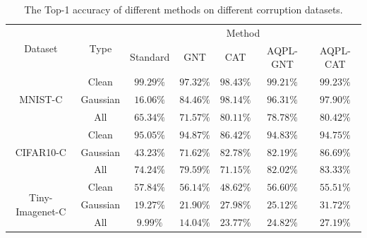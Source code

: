 \documentclass[letterpaper]{article} %
\begin{document}
\begin{table}[!t]
	\centering
	\begin{tabular}{c|c|ccccc}
		\hline
		\multirow{2}{*}{Dataset} & \multirow{2}{*}{Type}
		&\multicolumn{5}{c}{Method}\\
		\cline{3-7}
		&&Standard & GNT & CAT & AQPL-GNT & AQPL-CAT\\
		\hline
		\multirow{3}{*}{MNIST-C}
		& Clean & $\bm{99.29\%}$ & $97.32\%$ & $98.43\%$ & $99.21\%$ & $99.23\%$ \\
		& Gaussian & $16.06\%$ & $84.46\%$ & $\bm{98.14\%}$ & $96.31\%$ & $97.90\%$ \\
		& All & $65.34\%$ & $71.57\%$ & $80.11\%$ & $78.78\%$ & $\bm{80.42\%}$ \\
		\hline

		\multirow{3}{*}{CIFAR10-C}
		& Clean & $\bm{95.05\%}$ & $94.87\%$ & $86.42\%$ & $94.83\%$ & $94.75\%$ \\
		& Gaussian & $43.23\%$ & $71.62\%$ & $82.78\%$ & $82.19\%$ & $\bm{86.69\%}$ \\
		& All & $74.24\%$ & $79.59\%$ & $71.15\%$ & $82.02\%$ & $\bm{83.33\%}$ \\
		\hline

		\multirow{3}{*}{Tiny-Imagenet-C}
		& Clean & $\bm{57.84\%}$ & $56.14\%$ & $48.62\%$ & $56.60\%$ & $55.51\%$ \\
		& Gaussian & $19.27\%$ & $21.90\%$ & $27.98\%$ & $25.12\%$ & $\bm{31.72\%}$ \\
		& All & $9.99\%$ & $14.04\%$ & $23.77\%$ & $24.82\%$ & $\bm{27.19\%}$ \\

		\hline
	\end{tabular}
	\caption{The Top-1 accuracy of different methods on different corruption datasets.}
	\label{table:comparison}
\end{table}


\end{document}
